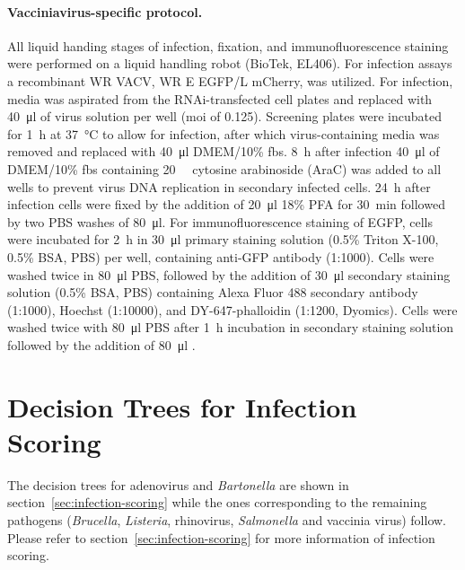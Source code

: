 \paragraph{Vacciniavirus-specific protocol.}
All liquid handing stages of infection, fixation, and immunofluorescence staining were performed on a liquid handling robot (BioTek, EL406). For infection assays a recombinant WR VACV, WR E EGFP\slash L mCherry, was utilized. For infection, media was aspirated from the RNAi-transfected cell plates and replaced with \SI{40}{\micro\litre} of virus solution per well (\gls{moi} of 0.125). Screening plates were incubated for \SI{1}{\hour} at \SI{37}{\celsius} to allow for infection, after which virus-containing media was removed and replaced with \SI{40}{\micro\litre} DMEM\slash 10\% \gls{fbs}. \SI{8}{\hour} after infection \SI{40}{\micro\litre} of DMEM\slash 10\% \gls{fbs} containing \SI{20}{\micro\Molar} cytosine arabinoside (AraC) was added to all wells to prevent virus DNA replication in secondary infected cells. \SI{24}{\hour} after infection cells were fixed by the addition of \SI{20}{\micro\litre} 18\% PFA for \SI{30}{\minute} followed by two PBS washes of \SI{80}{\micro\litre}. For immunofluorescence staining of EGFP, cells were incubated for \SI{2}{\hour} in \SI{30}{\micro\litre} primary staining solution (0.5\% Triton X-100, 0.5\% BSA, PBS) per well, containing anti-GFP antibody (1:1000). Cells were washed twice in \SI{80}{\micro\litre} PBS, followed by the addition of \SI{30}{\micro\litre} secondary staining solution (0.5\% BSA, PBS) containing Alexa Fluor 488 secondary antibody (1:1000), Hoechst (1:10000), and DY-647-phalloidin (1:1200, Dyomics). Cells were washed twice with \SI{80}{\micro\litre} PBS after \SI{1}{\hour} incubation in secondary staining solution followed by the addition of \SI{80}{\micro\litre} .

\section{Decision Trees for Infection Scoring}
The decision trees for adenovirus and \textit{Bartonella} are shown in section~\ref{sec:infection-scoring} while the ones corresponding to the remaining pathogens (\textit{Brucella}, \textit{Listeria}, rhinovirus, \textit{Salmonella} and vaccinia virus) follow. Please refer to section~\ref{sec:infection-scoring} for more information of infection scoring.

